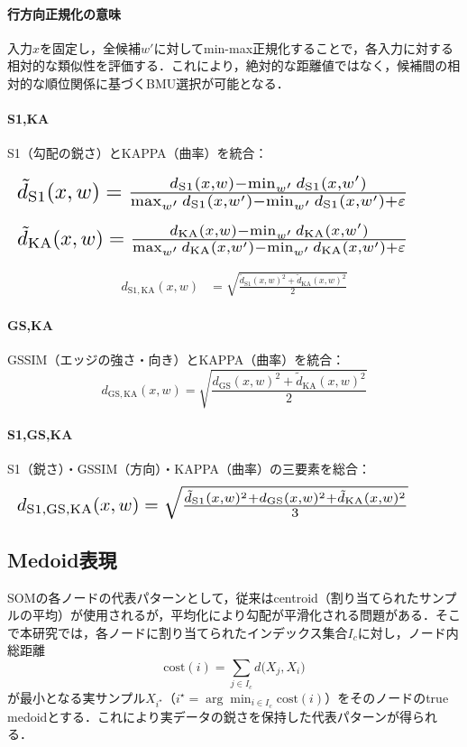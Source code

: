 \documentclass{jarticle}
\theoremstyle{definition}
\newcommand{\halfeq}[2][0.90\linewidth]{%
  \begin{equation}
    \makebox[\linewidth][l]{\resizebox{#1}{!}{\ensuremath{#2}}}%
  \end{equation}
}
\begin{document}
\paragraph{行方向正規化の意味}
入力$x$を固定し，全候補$w'$に対してmin-max正規化することで，各入力に対する相対的な類似性を評価する．これにより，絶対的な距離値ではなく，候補間の相対的な順位関係に基づくBMU選択が可能となる．

\paragraph{S1,KA}
S1（勾配の鋭さ）とKAPPA（曲率）を統合：

\halfeq{%
\tilde d_{\mathrm{S1}}(x,w)=\frac{d_{\mathrm{S1}}(x,w)-\min_{w'}d_{\mathrm{S1}}(x,w')}{\max_{w'}d_{\mathrm{S1}}(x,w')-\min_{w'}d_{\mathrm{S1}}(x,w')+\varepsilon}}
\halfeq{%
\tilde d_{\mathrm{KA}}(x,w)=\frac{d_{\mathrm{KA}}(x,w)-\min_{w'}d_{\mathrm{KA}}(x,w')}{\max_{w'}d_{\mathrm{KA}}(x,w')-\min_{w'}d_{\mathrm{KA}}(x,w')+\varepsilon}}
\begin{align}
d_{\mathrm{S1,KA}}(x,w)&=\sqrt{\frac{\tilde d_{\mathrm{S1}}(x,w)^2+\tilde d_{\mathrm{KA}}(x,w)^2}{2}}
\end{align}

\paragraph{GS,KA}
GSSIM（エッジの強さ・向き）とKAPPA（曲率）を統合：
\begin{equation}
d_{\mathrm{GS,KA}}(x,w)=\sqrt{\frac{d_{\mathrm{GS}}(x,w)^2+\tilde d_{\mathrm{KA}}(x,w)^2}{2}}
\end{equation}

\paragraph{S1,GS,KA}
S1（鋭さ）・GSSIM（方向）・KAPPA（曲率）の三要素を総合：
\halfeq{%
d_{\mathrm{S1,GS,KA}}(x,w)=\sqrt{\frac{\tilde d_{\mathrm{S1}}(x,w)^2+d_{\mathrm{GS}}(x,w)^2+\tilde d_{\mathrm{KA}}(x,w)^2}{3}}
}

\subsection{Medoid表現}
SOMの各ノードの代表パターンとして，従来はcentroid（割り当てられたサンプルの平均）が使用されるが，平均化により勾配が平滑化される問題がある．そこで本研究では，各ノードに割り当てられたインデックス集合$I_c$に対し，ノード内総距離
\begin{equation}
\mathrm{cost}(i)=\sum_{j\in I_c} d\bigl(X_j, X_i\bigr)
\end{equation}
が最小となる実サンプル$X_{i^\star}$（$i^\star=\arg\min_{i\in I_c}\mathrm{cost}(i)$）をそのノードのtrue medoidとする．これにより実データの鋭さを保持した代表パターンが得られる．
\end{document}
